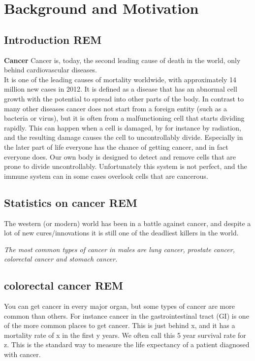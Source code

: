 	\section{Background and Motivation}
	\subsection{Introduction REM}
	\textbf{Cancer}
	Cancer is, today, the second leading cause of death in the world, only behind cardiovascular diseases.\\  %
	It is one of the leading causes of mortality worldwide, with approximately 14 million new cases in 2012. %
	It is defined as a disease that has an abnormal cell growth with the potential to spread into other parts of the body.%
	In contrast to many other diseases cancer does not start from a foreign entity (such as a bacteria or virus), but it is often from a malfunctioning cell that starts dividing rapidly. 
	This can happen when a cell is damaged, by for instance by radiation, and the resulting damage causes the cell to uncontrollably divide. 
	Especially in the later part of life everyone has the chance of getting cancer, and in fact everyone does. Our own body is designed to detect and remove cells that are prone
	to divide uncontrollably. Unfortunately this system is not perfect, and the immune system can in some cases overlook cells that are cancerous.
	
	
	
	\vspace{10px}
	
	\subsection{Statistics on cancer REM}
	The western (or modern) world has been in a battle against cancer, and despite a 
	lot of new cures/innovations it is still one of the deadliest killers in the world. 

	
	\textit{The most common types of cancer in males are lung cancer, prostate cancer, colorectal cancer and stomach cancer.\cite{stewart2014world}}
	
	
	\vspace{10px}
	\subsection{colorectal cancer REM}
	You can get cancer in every major organ, but some types of cancer are more common than others.
	For instance cancer in the gastrointestinal tract (GI) is one of the more common places 
	to get cancer. This is just behind x, and it has a mortality rate of x in the first y years. %
	We often call this 5 year survival rate for z. This is the standard way to measure the life expectancy of a patient diagnosed with cancer. 
	
